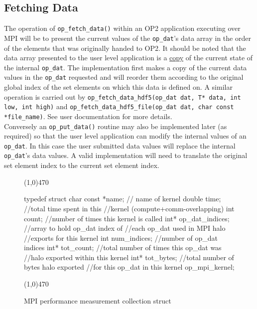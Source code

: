 \documentclass[11pt]{article}
\begin{document}
\subsection{Fetching Data}\label{subsec/putfetch}
The operation of \texttt{op\_fetch\_data()} within an OP2 application executing over MPI will be to present the current
values of the \texttt{op\_dat}'s data array in the order of the elements that was originally handed to OP2. It should be
noted that the data array presented to the user level application is a \underline{copy} of the current state of the
internal \texttt{op\_dat}. The implementation first makes a copy of the current data values in the \texttt{op\_dat}
requested and will reorder them according to the original global index of the set elements on which this data is defined
on. A similar operation is carried out by \texttt{op\_fetch\_data\_hdf5(op\_dat dat, T* data, int low, int high)} and
\texttt{op\_fetch\_data\_hdf5\_file(op\_dat dat, char const *file\_name)}. See user documentation for more details. \\

\noindent Conversely an \texttt{op\_put\_data()} routine may also be implemented later (as required) so that the user
level application can modify the internal values of an \texttt{op\_dat}. In this case the user submitted data values
will replace the internal \texttt{op\_dat}'s data values. A valid implementation will need to translate the original set
element index to the current set element index.

\begin{figure}[t]\small
\vspace{-0pt}\noindent\line(1,0){470}\vspace{-10pt}
\begin{pyglist}[language=c]
typedef struct
{
  char const  *name;   // name of kernel
  double      time;    //total time spent in this
                       //kernel (compute+comm-overlapping)
  int         count;   //number of times this kernel is called
  int*        op_dat_indices;  //array to hold op_dat index of
                               //each op_dat used in MPI halo
                               //exports for this kernel
  int         num_indices; //number of op_dat indices
  int*        tot_count;   //total number of times this op_dat was
                           //halo exported within this kernel
  int*        tot_bytes;   //total number of bytes halo exported
                           //for this op_dat in this kernel
} op_mpi_kernel;
\end{pyglist}
\vspace{-10pt}\noindent\line(1,0){470}\vspace{-10pt}
\caption{\small MPI performance measurement collection struct}
\normalsize\vspace{-0pt}\label{fig:perf}
\end{figure}
\end{document}

